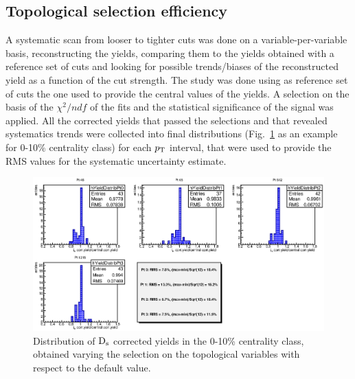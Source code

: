 \subsection{Topological selection efficiency}
A systematic scan from looser to tighter cuts was done on a variable-per-variable 
basis, reconstructing the yields, comparing them to the yields obtained 
with a reference set of cuts and looking for possible trends/biases of 
the reconstructed yield as a function of the cut strength.
The study was done using as reference set of cuts the one used 
to provide the central values of the yields. A selection
on the basis of the $\chi^2/ndf$ of the fits and the statistical significance
of the signal was applied. All the corrected yields that passed the selections
and that revealed systematics trends were collected into final distributions (Fig.~\ref{DsCutVar_010} as
an example for 0-10\% centrality class) for each $p_{\rm T}$ interval, that were 
used to provide the RMS values for the systematic uncertainty estimate. 
\begin{figure}[!ht]
 \begin{center}
   \includegraphics[angle=0, width=15cm]{./FigCap5/FinalSyst_010.eps}
 \end{center}
 \caption{Distribution of ${\rm D_s}$ corrected yields in the 0-10\% centrality class, obtained varying the selection on the topological variables with respect to the default value.}
 \label{DsCutVar_010} 
\end{figure}

